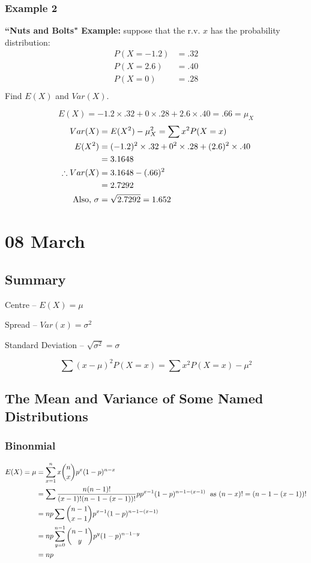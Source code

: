 \documentclass[12pt]{article}
\begin{document}
\subsubsection{Example 2}
\textbf{``Nuts and Bolts" Example:} suppose that the r.v. $x$ has the probability distribution:
\begin{align*}
    P(X = -1.2) &= .32 \\
    P(X = 2.6)  &= .40 \\
    P(X = 0)    &= .28 \\
\end{align*}
Find $E(X)$ and $Var(X)$.

\[
    E(X) = -1.2 \times .32 + 0 \times .28 + 2.6 \times .40 = .66 = \mu_X
\]
\begin{align*}
    Var(X) &= E(X^2) - \mu_X^2 = \sum x^2 P(X = x) \\
    E(X^2) &= (-1.2)^2 \times .32 + 0^2 \times .28 + (2.6)^2 \times .40 \\
        &= 3.1648 \\
    \therefore Var(X) &= 3.1648 - (.66)^2 \\
        &= 2.7292 \\
    \textnormal{Also, } \sigma &= \sqrt{2.7292} = 1.652
\end{align*}

\section{08 March}
\subsection{Summary}
Centre -- $E(X) = \mu$

Spread -- $Var(x) = \sigma^2$

Standard Deviation -- $\sqrt{\sigma^2} = \sigma$

\[
    \sum (x - \mu)^2 P(X = x) = \sum x^2 P(X = x) - \mu^2
\]

\subsection{The Mean and Variance of Some Named Distributions}
\subsubsection{Binonmial}
\begin{align*}
    E(X) = \mu &= \sum_{x=1}^{n} x {n \choose x} p^x (1-p)^{n-x} \\
        &= \sum \frac{n(n-1)!}{(x-1)! (n-1-(x-1))!} p p^{x-1} (1-p)^{n-1-(x-1)} \; \textnormal{ as } (n-x)! = (n-1-(x-1))! \\
        &= n p \sum {{n-1} \choose {x-1}} p^{x-1} (1-p)^{n-1-(x-1)} \\
        &= n p \sum_{y=0}^{n-1} {{n-1} \choose y} p^y (1-p)^{n-1-y} \\
        &= n p
\end{align*}
\end{document}
